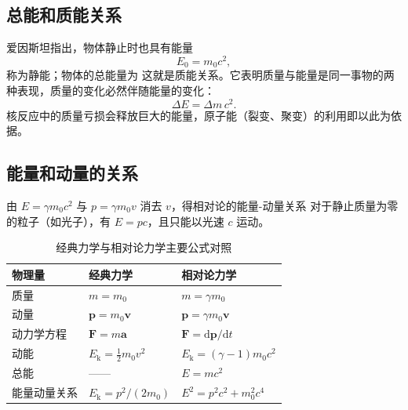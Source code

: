     \subsection{总能和质能关系}
    爱因斯坦指出，物体静止时也具有能量
    \[
    E_0=m_0c^{2},
    \]
    称为静能；物体的总能量为
    这就是质能关系。它表明质量与能量是同一事物的两种表现，质量的变化必然伴随能量的变化：
    \[
    \Delta E=\Delta m\,c^{2}.
    \]
    核反应中的质量亏损会释放巨大的能量，原子能（裂变、聚变）的利用即以此为依据。

    \subsection{能量和动量的关系}
    由 $E=\gamma m_0c^{2}$ 与 $p=\gamma m_0v$ 消去 $v$，得相对论的能量-动量关系
    对于静止质量为零的粒子（如光子），有 $E=pc$，且只能以光速 $c$ 运动。

    \begin{table}[htbp]
    \centering
    \caption{经典力学与相对论力学主要公式对照}
    \begin{tabular}{lll}
    \toprule
    物理量 & 经典力学 & 相对论力学 \\
    \midrule
    质量 & $m=m_0$ & $m=\gamma m_0$ \\
    动量 & $\boldsymbol{p}=m_0\boldsymbol{v}$ & $\boldsymbol{p}=\gamma m_0\boldsymbol{v}$ \\
    动力学方程 & $\boldsymbol{F}=m\boldsymbol{a}$ & $\boldsymbol{F}=\mathrm{d}\boldsymbol{p}/\mathrm{d}t$ \\
    动能 & $E_\mathrm{k}=\frac{1}{2}m_0v^{2}$ & $E_\mathrm{k}=(\gamma-1)m_0c^{2}$ \\
    总能 & —— & $E=mc^{2}$ \\
    能量动量关系 & $E_\mathrm{k}=p^{2}/(2m_0)$ & $E^{2}=p^{2}c^{2}+m_0^{2}c^{4}$ \\
    \bottomrule
    \end{tabular}
    \end{table}

